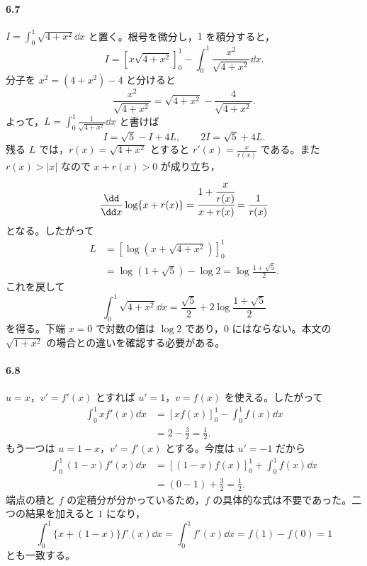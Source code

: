 \paragraph{6.7}
$I=\int_0^1\sqrt{4+x^2}\dd x$ と置く。根号を微分し，$1$ を積分すると，
\[
 I=[x\sqrt{4+x^2}]_0^1
   -\int_0^1\frac{x^2}{\sqrt{4+x^2}}\dd x.
\]
分子を $x^2=(4+x^2)-4$ と分けると
\[
 \frac{x^2}{\sqrt{4+x^2}}
 =\sqrt{4+x^2}-\frac4{\sqrt{4+x^2}}.
\]
よって，$L=\int_0^1\frac1{\sqrt{4+x^2}}\dd x$ と書けば
\[
 I=\sqrt5-I+4L,
 \qquad 2I=\sqrt5+4L.
\]
残る $L$ では，$r(x)=\sqrt{4+x^2}$ とすると $r'(x)=\frac{x}{r(x)}$ である。また $r(x)>|x|$ なので $x+r(x)>0$ が成り立ち，
\[
 \frac{\dd}{\dd x}\log\{x+r(x)\}
 =\cfrac{1+\cfrac{x}{r(x)}}{x+r(x)}
 =\frac1{r(x)}
\]
となる。したがって
\[
\begin{aligned}
 L&=[\log(x+\sqrt{4+x^2})]_0^1\\
  &=\log(1+\sqrt5)-\log2
   =\log\frac{1+\sqrt5}{2}.
\end{aligned}
\]
これを戻して
\[
 \boxed{\int_0^1\sqrt{4+x^2}\dd x
 =\frac{\sqrt5}{2}+2\log\frac{1+\sqrt5}{2}}
\]
を得る。下端 $x=0$ で対数の値は $\log2$ であり，$0$ にはならない。本文の $\sqrt{1+x^2}$ の場合との違いを確認する必要がある。

\paragraph{6.8}
$u=x$，$v'=f'(x)$ とすれば $u'=1$，$v=f(x)$ を使える。したがって
\[
\begin{aligned}
 \int_0^1xf'(x)\dd x
 &=[xf(x)]_0^1-\int_0^1f(x)\dd x\\
 &=2-\frac32=\frac12.
\end{aligned}
\]
もう一つは $u=1-x$，$v'=f'(x)$ とする。今度は $u'=-1$ だから
\[
\begin{aligned}
 \int_0^1(1-x)f'(x)\dd x
 &=[(1-x)f(x)]_0^1+\int_0^1f(x)\dd x\\
 &=(0-1)+\frac32=\frac12.
\end{aligned}
\]
端点の積と $f$ の定積分が分かっているため，$f$ の具体的な式は不要であった。二つの結果を加えると $1$ になり，
\[
 \int_0^1\{x+(1-x)\}f'(x)\dd x
 =\int_0^1f'(x)\dd x=f(1)-f(0)=1
\]
とも一致する。
